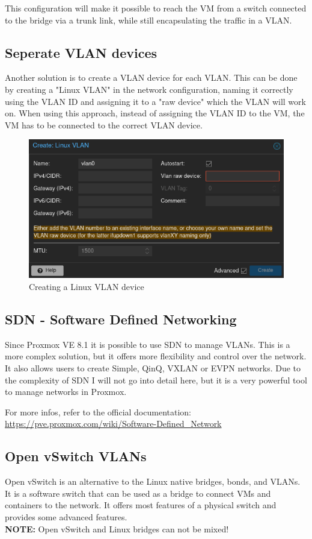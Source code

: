 This configuration will make it possible to reach the VM from a switch connected to the bridge via a trunk link, while still encapsulating the traffic in a VLAN.

\subsection{Seperate VLAN devices}

Another solution is to create a VLAN device for each VLAN. This can be done by creating a "Linux VLAN" in the network configuration, naming it correctly using the VLAN ID and assigning it to a "raw device" which the VLAN will work on.
When using this approach, instead of assigning the VLAN ID to the VM, the VM has to be connected to the correct VLAN device.



\begin{figure}[H]
	\centering
	\includegraphics[width=0.8\linewidth]{Figures/linux-vlan-device.png}
	\caption{Creating a Linux VLAN device}
\end{figure}


\subsection{SDN - Software Defined Networking}
Since Proxmox VE 8.1 it is possible to use SDN to manage VLANs. This is a more complex solution, but it offers more flexibility and control over the network.
It also allows users to create Simple, QinQ, VXLAN or EVPN networks. Due to the complexity of SDN I will not go into detail here, but it is a very powerful tool to manage networks in Proxmox.

For more infos, refer to the official documentation:\\
\url{https://pve.proxmox.com/wiki/Software-Defined_Network}

\subsection{Open vSwitch VLANs}

Open vSwitch is an alternative to the Linux native bridges, bonds, and VLANs. It is a software switch that can be used as a bridge to connect VMs and containers to the network. It offers most features of a physical switch and provides some advanced features. \\
\textbf{NOTE:} Open vSwitch and Linux bridges can not be mixed! 
